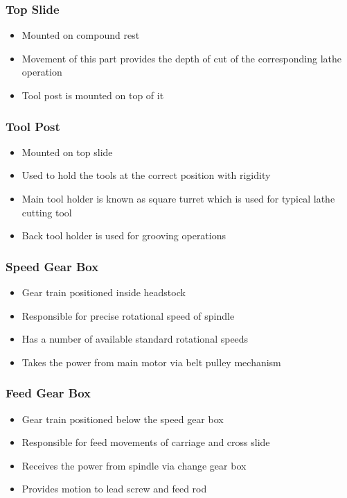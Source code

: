 \documentclass{article}
\begin{document}
\subsubsection*{Top Slide}
\begin{itemize}
  \item Mounted on compound rest
  \item Movement of this part provides the depth of 
  cut of the corresponding lathe operation
  \item Tool post is mounted on top of it
\end{itemize}

\subsubsection*{Tool Post}
\begin{itemize}
  \item Mounted on top slide
  \item Used to hold the tools at the correct position with rigidity
  \item Main tool holder is known as square turret which is used for typical lathe cutting tool
  \item Back tool holder is used for grooving operations
\end{itemize}

\subsubsection*{Speed Gear Box}
\begin{itemize}
  \item Gear train positioned inside headstock
  \item Responsible for precise rotational speed of spindle
  \item Has a number of available standard rotational speeds 
  \item Takes the power from main motor via belt pulley mechanism
\end{itemize}

\subsubsection*{Feed Gear Box}
\begin{itemize}
  \item Gear train positioned below the speed gear box
  \item Responsible for feed movements of carriage and cross slide
  \item Receives the power from spindle via change gear box
  \item Provides motion to lead screw and feed rod
\end{itemize}
\end{document}
